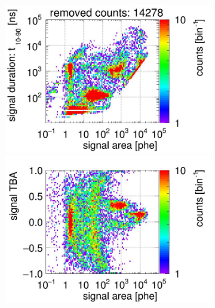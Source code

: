 \begin{landscape}
\begin{figure}[!p]
\begin{subfigure}[t]{0.33\textwidth}
			\includegraphics[width=\figurewidth,clip,trim={0 98 0 10}]{Figures/GasTest/CutsValid/res64769/pdpaX23Vecfig64769.jpg}
			\includegraphics[width=\figurewidth,clip,trim={0 0 0 40}]{Figures/GasTest/CutsValid/res64769/tbapaX23Vecfig64769.jpg}
			\caption{}
			\label{fig:signal selection dv 14 02}
		\end{subfigure}
		\begin{subfigure}[t]{0.33\textwidth}
			\centering

\end{subfigure}
\end{figure}
\end{landscape}
